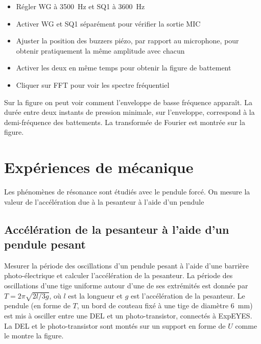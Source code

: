 \documentclass[a4paper,12pt,french]{sphinxmanual}
\let\sphinxpxdimen\pdfpxdimen\else\newdimen\sphinxpxdimen
\begin{document}
\noindent\sphinxincludegraphics[width=300\sphinxpxdimen]{{sound-beats}.pdf}

\begin{itemize}
\item {} 
Régler WG à 3500 Hz et SQ1 à 3600 Hz

\item {} 
Activer WG et SQ1 séparément pour vérifier la sortie MIC

\item {} 
Ajuster la position des buzzers piézo, par rapport au microphone,
pour obtenir pratiquement la même amplitude avec chacun

\item {} 
Activer les deux en même temps pour obtenir la figure de battement

\item {} 
Cliquer sur FFT pour voir les spectre fréquentiel

\end{itemize}


Sur la figure on peut voir comment l’enveloppe de basse fréquence
apparaît. La durée entre deux instants de pression minimale, sur
l’enveloppe, correspond à la demi-fréquence des battements. La
transformée de Fourier est montrée sur la figure.


\chapter{Expériences de mécanique}
\label{\detokenize{index:experiences-de-mecanique}}
Les phénomènes de résonance sont étudiés avec le pendule forcé. On
mesure la valeur de l’accélération due à la pesanteur à l’aide d’un
pendule


\section{Accélération de la pesanteur à l’aide d’un pendule pesant}
\label{\detokenize{6.1:acceleration-de-la-pesanteur-a-laide-dun-pendule-pesant}}\label{\detokenize{6.1::doc}}

Mesurer la période des oscillations d’un pendule pesant à l’aide d’une
barrière photo-électrique et calculer l’accélération de la pesanteur. La
période des oscillations d’une tige uniforme autour d’une de ses
extrémités est donnée par \(T = 2\pi\sqrt{2l/3g}\), où \(l\) est la
longueur et \(g\) est l’accélération de la pesanteur. Le pendule (en forme
de \(T\), un bord de couteau fixé à une tige de diamètre 6 mm) est mis à
osciller entre une DEL et un photo-transistor, connectés à ExpEYES. La
DEL et le photo-transistor sont montés sur un support en forme de \(U\)
comme le montre la figure.
\end{document}
